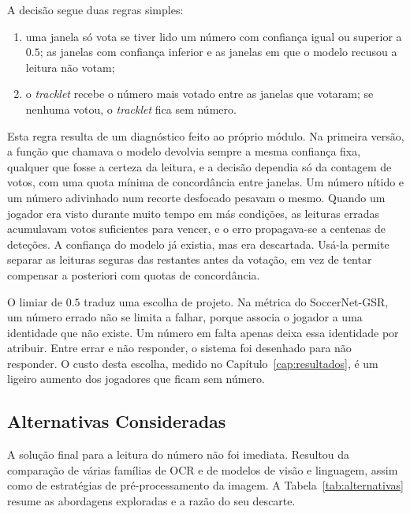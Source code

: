 A decisão segue duas regras simples:
\begin{enumerate}
    \item uma janela só vota se tiver lido um número com confiança igual ou superior a $0.5$; as
    janelas com confiança inferior e as janelas em que o modelo recusou a leitura não votam;
    \item o \emph{tracklet} recebe o número mais votado entre as janelas que votaram; se nenhuma
    votou, o \emph{tracklet} fica sem número.
\end{enumerate}

Esta regra resulta de um diagnóstico feito ao próprio módulo. Na primeira versão, a função que
chamava o modelo devolvia sempre a mesma confiança fixa, qualquer que fosse a certeza da leitura,
e a decisão dependia só da contagem de votos, com uma quota mínima de concordância entre janelas.
Um número nítido e um número adivinhado num recorte desfocado pesavam o mesmo. Quando um jogador
era visto durante muito tempo em más condições, as leituras erradas acumulavam votos suficientes
para vencer, e o erro propagava-se a centenas de deteções. A confiança do modelo já existia, mas
era descartada. Usá-la permite separar as leituras seguras das restantes antes da votação, em vez
de tentar compensar a posteriori com quotas de concordância.

O limiar de $0.5$ traduz uma escolha de projeto. Na métrica do SoccerNet-GSR, um número errado não se limita
a falhar, porque associa o jogador a uma identidade que não existe. Um número em falta apenas deixa
essa identidade por atribuir. Entre errar e não responder, o sistema foi desenhado para não
responder. O custo desta escolha, medido no Capítulo~\ref{cap:resultados}, é um ligeiro aumento dos
jogadores que ficam sem número.

\subsection{Alternativas Consideradas}

A solução final para a leitura do número não foi imediata. Resultou da comparação de várias famílias
de OCR e de modelos de visão e linguagem, assim como de estratégias de pré-processamento da imagem.
A Tabela~\ref{tab:alternativas} resume as abordagens exploradas e a razão do seu descarte.

